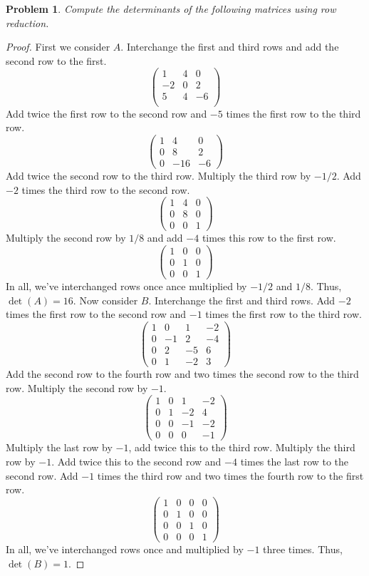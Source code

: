 \documentclass{article}
\newtheorem{problem}{Problem}
\begin{document}
\begin{problem}
Compute the determinants of the following matrices using row reduction.
\end{problem}
\begin{proof}
First we consider $A$. Interchange the first and third rows and add the second row to the first.
\[
\left (
\begin{array}{ccc}
1 & 4 & 0\\
-2 & 0 & 2\\
5 & 4 & -6\\
\end{array}
\right )
\]
Add twice the first row to the second row and $-5$ times the first row to the third row.
\[
\left (
\begin{array}{ccc}
1 & 4 & 0\\
0 & 8 & 2\\
0 & -16 & -6
\end{array}
\right )
\]
Add twice the second row to the third row. Multiply the third row by $-1/2$. Add $-2$ times the third row to the second row.
\[
\left (
\begin{array}{ccc}
1 & 4 & 0\\
0 & 8 & 0\\
0 & 0 & 1
\end{array}
\right )
\]
Multiply the second row by $1/8$ and add $-4$ times this row to the first row.
\[
\left (
\begin{array}{ccc}
1 & 0 & 0\\
0 & 1 & 0\\
0 & 0 & 1
\end{array}
\right )
\]
In all, we've interchanged rows once ance multiplied by $-1/2$ and $1/8$. Thus, $\det(A) = 16$. Now consider $B$. Interchange the first and third rows. Add $-2$ times the first row to the second row and $-1$ times the first row to the third row.
\[
\left (
\begin{array}{cccc}
1 & 0 & 1 & -2\\
0 & -1 & 2 & -4\\
0 & 2 & -5 & 6\\
0 & 1 & -2 & 3
\end{array}
\right )
\]
Add the second row to the fourth row and two times the second row to the third row. Multiply the second row by $-1$.
\[
\left (
\begin{array}{cccc}
1 & 0 & 1 & -2\\
0 & 1 & -2 & 4\\
0 & 0 & -1 & -2\\
0 & 0 & 0 & -1
\end{array}
\right )
\]
Multiply the last row by $-1$, add twice this to the third row. Multiply the third row by $-1$. Add twice this to the second row and $-4$ times the last row to the second row. Add $-1$ times the third row and two times the fourth row to the first row.
\[
\left (
\begin{array}{cccc}
1 & 0 & 0 & 0\\
0 & 1 & 0 & 0\\
0 & 0 & 1 & 0\\
0 & 0 & 0 & 1
\end{array}
\right )
\]
In all, we've interchanged rows once and multiplied by $-1$ three times. Thus, $\det(B) = 1$.
\end{proof}
\end{document}
